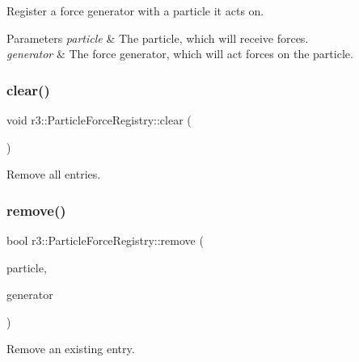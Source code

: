 Register a force generator with a particle it acts on. 


\begin{DoxyParams}{Parameters}
{\em particle} & The particle, which will receive forces. \\
\hline
{\em generator} & The force generator, which will act forces on the particle. \\
\hline
\end{DoxyParams}
\mbox{\label{classr3_1_1_particle_force_registry_ac49c38fa041447278c56e68c6e796d77}} 
\subsubsection{\texorpdfstring{clear()}{clear()}}
{\footnotesize\ttfamily void r3\+::\+Particle\+Force\+Registry\+::clear (\begin{DoxyParamCaption}{ }\end{DoxyParamCaption})}



Remove all entries. 

\mbox{\label{classr3_1_1_particle_force_registry_aa4aa0458e212f63a7a9248318fee1016}} 
\subsubsection{\texorpdfstring{remove()}{remove()}}
{\footnotesize\ttfamily bool r3\+::\+Particle\+Force\+Registry\+::remove (\begin{DoxyParamCaption}\item[{\mbox{\hyperlink{classr3_1_1_particle}{Particle}} $\ast$}]{particle,  }\item[{\mbox{\hyperlink{classr3_1_1_i_particle_force_generator}{I\+Particle\+Force\+Generator}} $\ast$}]{generator }\end{DoxyParamCaption})}



Remove an existing entry. 


